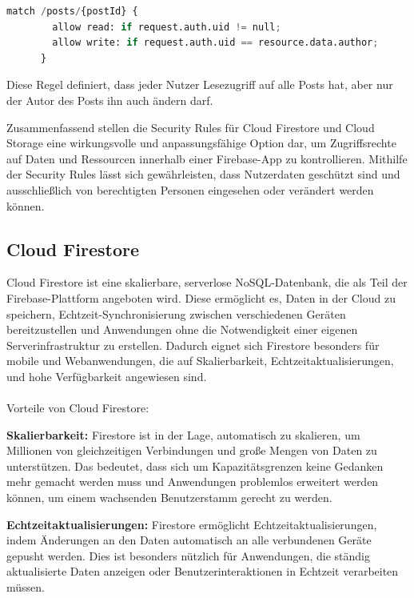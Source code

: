 \begin{lstlisting}[language=Python,caption=Security Rules Beispiel]
    match /posts/{postId} {
        allow read: if request.auth.uid != null;
        allow write: if request.auth.uid == resource.data.author;
      }
\end{lstlisting}

Diese Regel definiert, dass jeder Nutzer Lesezugriff auf
alle Posts hat, aber nur der Autor des Posts ihn auch ändern
darf.

Zusammenfassend stellen die Security Rules für Cloud Firestore und Cloud Storage eine wirkungsvolle und anpassungsfähige Option dar, um Zugriffsrechte auf Daten und Ressourcen innerhalb einer Firebase-App zu kontrollieren. Mithilfe der Security Rules lässt sich gewährleisten, dass Nutzerdaten geschützt sind und ausschließlich von berechtigten Personen eingesehen oder verändert werden können.



\subsection{Cloud Firestore}
\author{Sandin Habibovic}

Cloud Firestore ist eine skalierbare, serverlose NoSQL-Datenbank, die als Teil der Firebase-Plattform angeboten wird. Diese ermöglicht es, Daten in der Cloud zu speichern, Echtzeit-Synchronisierung zwischen verschiedenen Geräten bereitzustellen und Anwendungen ohne die Notwendigkeit einer eigenen Serverinfrastruktur zu erstellen. Dadurch eignet sich Firestore besonders für mobile und Webanwendungen, die auf Skalierbarkeit, Echtzeitaktualisierungen, und hohe Verfügbarkeit angewiesen sind.
\\\\
Vorteile von Cloud Firestore:

\textbf{Skalierbarkeit:} Firestore ist in der Lage, automatisch zu skalieren, um Millionen von gleichzeitigen Verbindungen und große Mengen von Daten zu unterstützen. Das bedeutet, dass sich um Kapazitätsgrenzen keine Gedanken mehr gemacht werden muss und Anwendungen problemlos erweitert werden können, um einem wachsenden Benutzerstamm gerecht zu werden.

\textbf{Echtzeitaktualisierungen:} Firestore ermöglicht Echtzeitaktualisierungen, indem Änderungen an den Daten automatisch an alle verbundenen Geräte gepusht werden. Dies ist besonders nützlich für Anwendungen, die ständig aktualisierte Daten anzeigen oder Benutzerinteraktionen in Echtzeit verarbeiten müssen.

